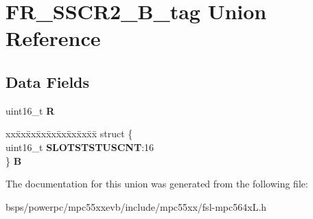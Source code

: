 \hypertarget{unionFR__SSCR2__16B__tag}{}\section{F\+R\+\_\+\+S\+S\+C\+R2\+\_\+B\+\_\+tag Union Reference}
\label{unionFR__SSCR2__16B__tag}
\subsection*{Data Fields}
\begin{DoxyCompactItemize}
\item 
\mbox{\label{unionFR__SSCR2__16B__tag_a5dd0cffbe6b49a34fc793ad714e2a088}} 
uint16\+\_\+t {\bfseries R}
\item 
\mbox{\label{unionFR__SSCR2__16B__tag_a6518efb78a2b73c0be9ea31fab62c43c}} 
\begin{tabbing}
xx\=xx\=xx\=xx\=xx\=xx\=xx\=xx\=xx\=\kill
struct \{\\
\>uint16\_t {\bfseries SLOTSTSTUSCNT}:16\\
\} {\bfseries B}\\

\end{tabbing}\end{DoxyCompactItemize}


The documentation for this union was generated from the following file\+:\begin{DoxyCompactItemize}
\item 
bsps/powerpc/mpc55xxevb/include/mpc55xx/fsl-\/mpc564x\+L.\+h\end{DoxyCompactItemize}
